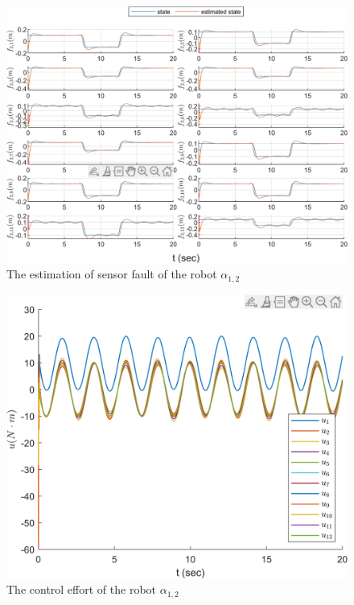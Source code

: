 \documentclass{ieeeaccess}
\begin{document}
\begin{figure}[htbp]
    \centering
    \includegraphics[scale=.57]{fig/robot (3).png}\caption{The estimation of sensor fault of the robot $\alpha_{1,2}$}%
    \label{fig:robot, fs}
\end{figure}
\begin{figure}[htbp]
    \centering
    \includegraphics[scale=.57]{fig/robot (4).png}\caption{The control effort of the robot $\alpha_{1,2}$}%
    \label{fig:robot, control}
\end{figure}
\end{document}
